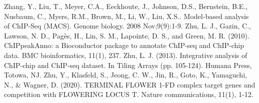 \documentclass{article}
\begin{document}
\begin{sloppypar}
\begin{thebibliography}{9}
Zhang, Y., Liu, T., Meyer, C.A., Eeckhoute, J., Johnson, D.S., Bernstein, B.E., Nusbaum, C., Myers, R.M., Brown, M., Li, W., Liu, X.S.. Model-based analysis of ChIP-Seq (MACS). Genome biology. 2008 Nov;9(9):1-9.
Zhu, L. J., Gazin, C., Lawson, N. D., Pagès, H., Lin, S. M., Lapointe, D. S., and Green, M. R. (2010). ChIPpeakAnno: a Bioconductor package to annotate ChIP-seq and ChIP-chip data. BMC bioinformatics, 11(1), 237.
Zhu, L. J. (2013). Integrative analysis of ChIP-chip and ChIP-seq dataset. In Tiling Arrays (pp. 105-124). Humana Press, Totowa, NJ.
Zhu, Y., Klasfeld, S., Jeong, C. W., Jin, R., Goto, K., Yamaguchi, N., \& Wagner, D. (2020). TERMINAL FLOWER 1-FD complex target genes and competition with FLOWERING LOCUS T. Nature communications, 11(1), 1-12.
\end{thebibliography}

\end{sloppypar}
\end{document}
